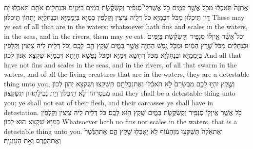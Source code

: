 {אֶת\maqqaf זֶה֙ תֹּֽאכְל֔וּ מִכֹּ֖ל אֲשֶׁ֣ר בַּמָּ֑יִם כֹּ֣ל אֲשֶׁר\maqqaf לוֹ֩ סְנַפִּ֨יר וְקַשְׂקֶ֜שֶׂת בַּמַּ֗יִם בַּיַּמִּ֛ים וּבַנְּחָלִ֖ים אֹתָ֥ם תֹּאכֵֽלוּ׃}
{יָת דֵּין תֵּיכְלוּן מִכֹּל דִּבְמַיָּא כֹּל דְּלֵיהּ צִיצִין וְקַלְפִין בְּמַיָּא בְּיַמְמַיָּא וּבְנַחְלַיָּא יָתְהוֹן תֵּיכְלוּן׃}
{These may ye eat of all that are in the waters: whatsoever hath fins and scales in the waters, in the seas, and in the rivers, them may ye eat.}{}
{וְכֹל֩ אֲשֶׁ֨ר אֵֽין\maqqaf ל֜וֹ סְנַפִּ֣יר וְקַשְׂקֶ֗שֶׂת בַּיַּמִּים֙ וּבַנְּחָלִ֔ים מִכֹּל֙ שֶׁ֣רֶץ הַמַּ֔יִם וּמִכֹּ֛ל נֶ֥פֶשׁ הַחַיָּ֖ה אֲשֶׁ֣ר בַּמָּ֑יִם שֶׁ֥קֶץ הֵ֖ם לָכֶֽם׃}
{וְכֹל דְּלֵית לֵיהּ צִיצִין וְקַלְפִין בְּיַמְמַיָּא וּבְנַחְלַיָּא מִכֹּל רִחְשָׁא דְּמַיָּא וּמִכֹּל נַפְשָׁא חַיְתָא דִּבְמַיָּא שִׁקְצָא אִנּוּן לְכוֹן׃}
{And all that have not fins and scales in the seas, and in the rivers, of all that swarm in the waters, and of all the living creatures that are in the waters, they are a detestable thing unto you,}{}
{וְשֶׁ֖קֶץ יִהְי֣וּ לָכֶ֑ם מִבְּשָׂרָם֙ לֹ֣א תֹאכֵ֔לוּ וְאֶת\maqqaf נִבְלָתָ֖ם תְּשַׁקֵּֽצוּ׃}
{וְשִׁקְצָא יְהוֹן לְכוֹן מִבִּסְרְהוֹן לָא תֵיכְלוּן וְיָת נְבִילַתְהוֹן תְּשַׁקְּצוּן׃}
{and they shall be a detestable thing unto you; ye shall not eat of their flesh, and their carcasses ye shall have in detestation.}{}
{כֹּ֣ל אֲשֶׁ֥ר אֵֽין\maqqaf ל֛וֹ סְנַפִּ֥יר וְקַשְׂקֶ֖שֶׂת בַּמָּ֑יִם שֶׁ֥קֶץ ה֖וּא לָכֶֽם׃}
{כֹּל דְּלֵית לֵיהּ צִיצִין וְקַלְפִין בְּמַיָּא שִׁקְצָא הוּא לְכוֹן׃}
{Whatsoever hath no fins nor scales in the waters, that is a detestable thing unto you.}{}
{וְאֶת\maqqaf אֵ֙לֶּה֙ תְּשַׁקְּצ֣וּ מִן\maqqaf הָע֔וֹף לֹ֥א יֵאָכְל֖וּ שֶׁ֣קֶץ הֵ֑ם אֶת\maqqaf הַנֶּ֙שֶׁר֙ וְאֶת\maqqaf הַפֶּ֔רֶס וְאֵ֖ת הָעׇזְנִיָּֽה׃}
